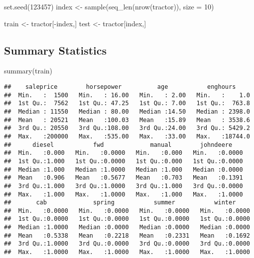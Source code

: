 \documentclass[
]{article}
\newenvironment{Shaded}{\begin{snugshade}}{\end{snugshade}}
\newcommand{\AttributeTok}[1]{\textcolor[rgb]{0.77,0.63,0.00}{#1}}
\newcommand{\DecValTok}[1]{\textcolor[rgb]{0.00,0.00,0.81}{#1}}
\newcommand{\FunctionTok}[1]{\textcolor[rgb]{0.00,0.00,0.00}{#1}}
\newcommand{\NormalTok}[1]{#1}
\newcommand{\OtherTok}[1]{\textcolor[rgb]{0.56,0.35,0.01}{#1}}
\newcommand{\SpecialCharTok}[1]{\textcolor[rgb]{0.00,0.00,0.00}{#1}}
\begin{document}
\begin{Shaded}
\begin{Highlighting}[]
\FunctionTok{set.seed}\NormalTok{(}\DecValTok{123457}\NormalTok{)}
\NormalTok{index }\OtherTok{\textless{}{-}} \FunctionTok{sample}\NormalTok{(}\FunctionTok{seq\_len}\NormalTok{(}\FunctionTok{nrow}\NormalTok{(tractor)), }\AttributeTok{size =} \DecValTok{10}\NormalTok{)}

\NormalTok{train }\OtherTok{\textless{}{-}}\NormalTok{ tractor[}\SpecialCharTok{{-}}\NormalTok{index,]}
\NormalTok{test }\OtherTok{\textless{}{-}}\NormalTok{ tractor[index,]}
\end{Highlighting}
\end{Shaded}

\hypertarget{summary-statistics}{%
\subsection{Summary Statistics}\label{summary-statistics}}

\begin{Shaded}
\begin{Highlighting}[]
\FunctionTok{summary}\NormalTok{(train)}
\end{Highlighting}
\end{Shaded}

\begin{verbatim}
##    saleprice        horsepower          age           enghours      
##  Min.   :  1500   Min.   : 16.00   Min.   : 2.00   Min.   :    1.0  
##  1st Qu.:  7562   1st Qu.: 47.25   1st Qu.: 7.00   1st Qu.:  763.8  
##  Median : 11550   Median : 80.00   Median :14.50   Median : 2398.0  
##  Mean   : 20521   Mean   :100.03   Mean   :15.89   Mean   : 3538.6  
##  3rd Qu.: 20550   3rd Qu.:108.00   3rd Qu.:24.00   3rd Qu.: 5429.2  
##  Max.   :200000   Max.   :535.00   Max.   :33.00   Max.   :18744.0  
##      diesel           fwd             manual        johndeere     
##  Min.   :0.000   Min.   :0.0000   Min.   :0.000   Min.   :0.0000  
##  1st Qu.:1.000   1st Qu.:0.0000   1st Qu.:0.000   1st Qu.:0.0000  
##  Median :1.000   Median :1.0000   Median :1.000   Median :0.0000  
##  Mean   :0.906   Mean   :0.5677   Mean   :0.703   Mean   :0.1391  
##  3rd Qu.:1.000   3rd Qu.:1.0000   3rd Qu.:1.000   3rd Qu.:0.0000  
##  Max.   :1.000   Max.   :1.0000   Max.   :1.000   Max.   :1.0000  
##       cab             spring           summer           winter      
##  Min.   :0.0000   Min.   :0.0000   Min.   :0.0000   Min.   :0.0000  
##  1st Qu.:0.0000   1st Qu.:0.0000   1st Qu.:0.0000   1st Qu.:0.0000  
##  Median :1.0000   Median :0.0000   Median :0.0000   Median :0.0000  
##  Mean   :0.5338   Mean   :0.2218   Mean   :0.2331   Mean   :0.1692  
##  3rd Qu.:1.0000   3rd Qu.:0.0000   3rd Qu.:0.0000   3rd Qu.:0.0000  
##  Max.   :1.0000   Max.   :1.0000   Max.   :1.0000   Max.   :1.0000
\end{verbatim}
\end{document}
